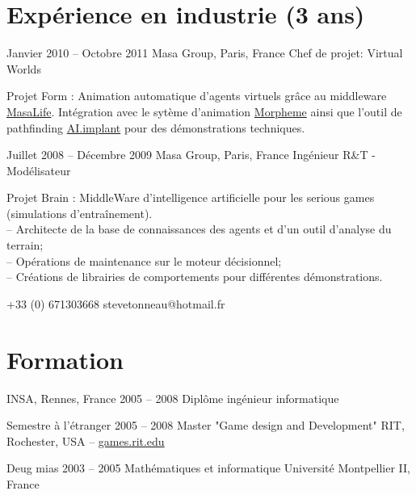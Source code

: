 \documentclass{tccv}
\begin{document}
\section{Exp\'{e}rience en industrie (3 ans)}

\begin{eventlist}

\item{Janvier 2010 -- Octobre 2011}
     {Masa Group, Paris, France}
     {Chef de projet: Virtual Worlds}

Projet Form : Animation automatique d'agents virtuels gr\^{a}ce au middleware \href{http://www.masagroup.net/products/masa-life/}{MasaLife}.
Int\'{e}gration avec le syt\`{e}me d'animation \href{http://www.naturalmotion.com/products/morpheme/}{Morpheme} ainsi que l'outil de pathfinding
\href{http://www.presagis.com/products_services/products/modeling-simulation/simulation/aiimplant/}{AI.implant} pour des d\'{e}monstrations techniques.

\item{Juillet 2008 -- D\'{e}cembre 2009}
     {Masa Group, Paris, France}
     {Ing\'{e}nieur R\&T - Mod\'{e}lisateur}

Projet Brain : MiddleWare d'intelligence artificielle pour les serious games (simulations d'entra\^{i}nement).
\\ -- Architecte de la base de connaissances des agents et d'un outil d'analyse du terrain;
\\ -- Op\'{e}rations de maintenance sur le moteur d\'{e}cisionnel;
\\ -- Cr\'{e}ations de librairies de comportements pour diff\'{e}ren\-tes d\'{e}monstrations.


\end{eventlist}


    {+33 (0) 671303668}
    {stevetonneau@hotmail.fr}

\section{Formation}

\begin{yearlist}
 
\item[INSA, Rennes, France]{2005 -- 2008 }
     {Dipl\^ome ing\'{e}nieur informatique}
	 
\item[Semestre \`{a} l'\'{e}tranger]{2005 -- 2008 }
     {Master "Game design and Development"}
     {RIT, Rochester, USA -- \href{http://games.rit.edu/}{games.rit.edu}}

\item[Deug mias]{2003 -- 2005 }
     {Math\'{e}matiques et informatique}
     {Universit\'{e} Montpellier II, France}
	 
\end{yearlist}
	
\end{document}
